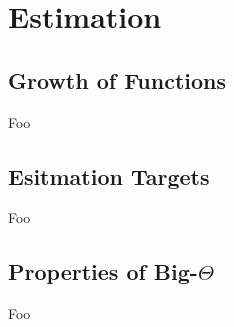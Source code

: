 \section{Estimation}

\subsection{Growth of Functions}

Foo

\subsection{Esitmation Targets}

Foo

\subsection{Properties of Big-$\Theta$}

Foo

